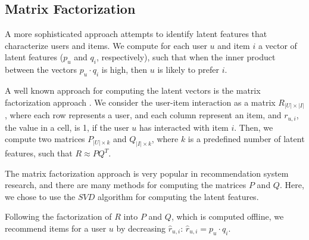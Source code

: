 \documentclass[letterpaper]{article} %
\newcommand{\kibitz}[2]{\ifnum\Comments=1{\textcolor{#1}{#2}}\fi}
\newcommand{\as}[1]{\kibitz{ orange}{[AS:#1]}}
\begin{document}


\subsection{Matrix Factorization}

A more sophisticated approach attempts to identify latent features that characterize users and items. We compute for each user $u$ and item $i$ a vector of latent features ($p_u$ and $q_i$, respectively), such that when the inner product between the vectors $p_u \cdot q_i$ is high, then $u$ is likely to prefer $i$.

A well known approach for computing the latent vectors is the matrix factorization approach \cite{koren2009matrix,koren2015advances}. We consider the user-item interaction as a matrix $R_{|U|\times|I|}$, where each row represents a user, and each column represent an item, and $r_{u,i}$, the value in a cell, is 1, if the user $u$ has interacted with item $i$. Then, we compute two matrices $P_{|U|\times k}$ and $Q_{|I| \times k}$, where $k$ is a predefined number of latent features, such that $R \approx P Q^T$.

The matrix factorization approach is very popular in recommendation system research, and there are many methods for computing the matrices $P$ and $Q$. Here, we chose to use the $SVD$ algorithm \cite{sarwar2002incremental} for computing the latent features.

Following the factorization of $R$ into $P$ and $Q$, which is computed offline, we recommend items for a user $u$ by decreasing $\hat{r}_{u,i}$: $\hat{r}_{u,i}= p_u \cdot q_i$.


\end{document}
